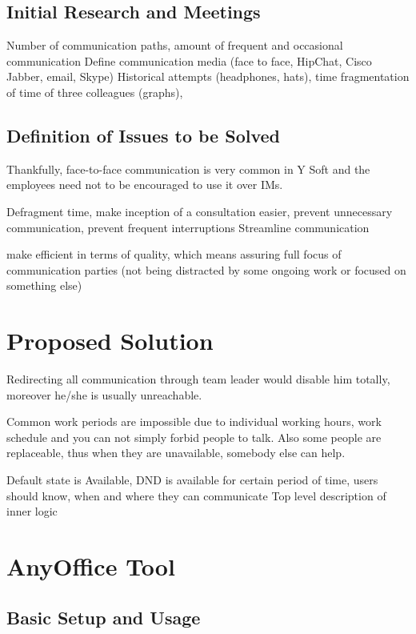 \documentclass[11pt,singleside]{myfithesis2}
\begin{document}
	\section{Initial Research and Meetings}
Number of communication paths, amount of frequent and occasional communication
Define communication media (face to face, HipChat, Cisco Jabber, email, Skype)
Historical attempts (headphones, hats), time fragmentation of time of three colleagues (graphs), 

	\section{Definition of Issues to be Solved}

Thankfully, face-to-face communication is very common in Y Soft and the employees need not to be encouraged to use it over IMs.

Defragment time, make inception of a consultation easier, prevent unnecessary communication, prevent frequent interruptions
Streamline communication

make efficient in terms of quality, which means assuring full focus of communication parties (not being distracted by some ongoing work or focused on something else)

\chapter{Proposed Solution}

Redirecting all communication through team leader would disable him totally, moreover he/she is usually unreachable.

Common work periods are impossible due to individual working hours, work schedule and you can not simply forbid people to talk. Also some people are replaceable, thus when they are unavailable, somebody else can help.

Default state is Available, DND is available for certain period of time, users should know, when and where they can communicate
Top level description of inner logic

\chapter{AnyOffice Tool}

	\section{Basic Setup and Usage}
\end{document}
